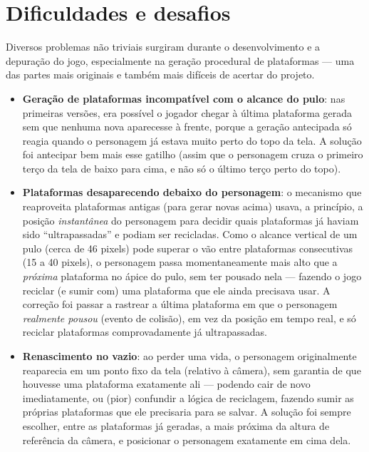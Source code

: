 \documentclass[a4paper,12pt]{article}
\begin{document}
\section{Dificuldades e desafios}

Diversos problemas não triviais surgiram durante o desenvolvimento e a
depuração do jogo, especialmente na geração procedural de plataformas ---
uma das partes mais originais e também mais difíceis de acertar do projeto.

\begin{itemize}
    \item \textbf{Geração de plataformas incompatível com o alcance do pulo}:
    nas primeiras versões, era possível o jogador chegar à última plataforma
    gerada sem que nenhuma nova aparecesse à frente, porque a geração
    antecipada só reagia quando o personagem já estava muito perto do topo
    da tela. A solução foi antecipar bem mais esse gatilho (assim que o
    personagem cruza o primeiro terço da tela de baixo para cima, e não só
    o último terço perto do topo).

    \item \textbf{Plataformas desaparecendo debaixo do personagem}: o
    mecanismo que reaproveita plataformas antigas (para gerar novas acima)
    usava, a princípio, a posição \emph{instantânea} do personagem para
    decidir quais plataformas já haviam sido ``ultrapassadas'' e podiam ser
    recicladas. Como o alcance vertical de um pulo (cerca de 46 pixels) pode
    superar o vão entre plataformas consecutivas (15 a 40 pixels), o
    personagem passa momentaneamente mais alto que a \emph{próxima}
    plataforma no ápice do pulo, sem ter pousado nela --- fazendo o jogo
    reciclar (e sumir com) uma plataforma que ele ainda precisava usar. A
    correção foi passar a rastrear a última plataforma em que o personagem
    \emph{realmente pousou} (evento de colisão), em vez da posição em tempo
    real, e só reciclar plataformas comprovadamente já ultrapassadas.

    \item \textbf{Renascimento no vazio}: ao perder uma vida, o personagem
    originalmente reaparecia em um ponto fixo da tela (relativo à câmera), sem
    garantia de que houvesse uma plataforma exatamente ali --- podendo cair de
    novo imediatamente, ou (pior) confundir a lógica de reciclagem, fazendo
    sumir as próprias plataformas que ele precisaria para se salvar. A solução
    foi sempre escolher, entre as plataformas já geradas, a mais próxima da
    altura de referência da câmera, e posicionar o personagem exatamente em
    cima dela.


\end{itemize}
\end{document}
